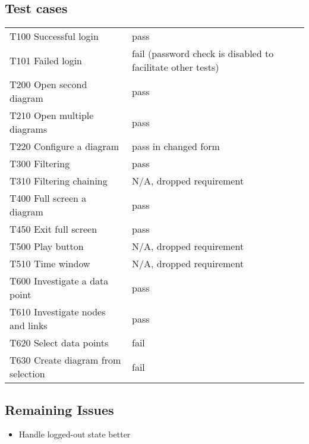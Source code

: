\documentclass[oneside, english, final]{design}
\begin{document}
\subsection{Test cases}
\begin{tabular}{l|l}
	T100 Successful login & pass \\
	T101 Failed login & fail (password check is disabled to facilitate other tests) \\
	T200 Open second diagram & pass \\
	T210 Open multiple diagrams & pass \\
	T220 Configure a diagram & pass in changed form \\
	T300 Filtering & pass \\
	T310 Filtering chaining & N/A, dropped requirement \\
	T400 Full screen a diagram & pass \\
	T450 Exit full screen & pass \\
	T500 Play button & N/A, dropped requirement \\
	T510 Time window & N/A, dropped requirement \\
	T600 Investigate a data point & pass \\
	T610 Investigate nodes and links & pass \\
	T620 Select data points & fail \\
	T630 Create diagram from selection & fail \\
\end {tabular}

\subsection{Remaining Issues}
\begin{itemize}
      \item{Handle logged-out state better}
      
\end{itemize}
      
\end{document}
